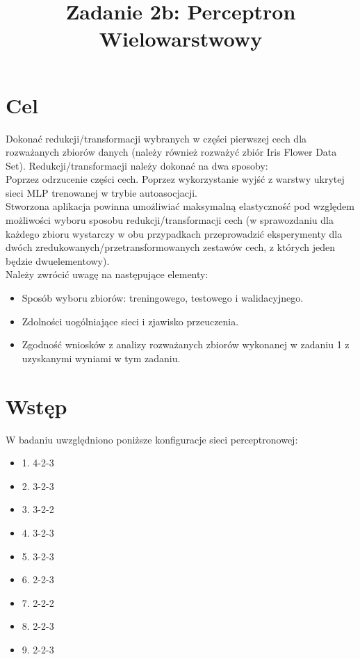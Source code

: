 \documentclass{classrep}
\author{
  \studentinfo{Łukasz Ochmański}{183566} \and
  \studentinfo{Przemysław Szwajkowski}{173524}
}
\title{Zadanie 2b: Perceptron Wielowarstwowy}
\begin{document}
\maketitle


\section{Cel}
Dokonać redukcji/transformacji wybranych w części pierwszej cech dla rozważanych zbiorów danych (należy również rozważyć zbiór Iris Flower Data Set). Redukcji/transformacji należy dokonać na dwa sposoby:
\\
    Poprzez odrzucenie części cech.
    Poprzez wykorzystanie wyjść z warstwy ukrytej sieci MLP trenowanej w trybie autoasocjacji.
\\
Stworzona aplikacja powinna umożliwiać maksymalną elastyczność pod względem możliwości wyboru sposobu redukcji/transformacji cech (w sprawozdaniu dla każdego zbioru wystarczy w obu przypadkach przeprowadzić eksperymenty dla dwóch zredukowanych/przetransformowanych zestawów cech, z których jeden będzie dwuelementowy).
\\
Należy zwrócić uwagę na następujące elementy:
\begin{itemize}
	\item Sposób wyboru zbiorów: treningowego, testowego i walidacyjnego.
  \item Zdolności uogólniające sieci i zjawisko przeuczenia.
  \item Zgodność wniosków z analizy rozważanych zbiorów wykonanej  w zadaniu 1 z uzyskanymi wyniami w tym zadaniu.
\end{itemize}

\section{Wstęp}
W badaniu uwzględniono poniższe konfiguracje sieci perceptronowej:
\begin{itemize}
\item
1. 4-2-3
\item
2. 3-2-3
\item
3. 3-2-2
\item
4. 3-2-3
\item
5. 3-2-3
\item
6. 2-2-3
\item
7. 2-2-2
\item
8. 2-2-3
\item
9. 2-2-3
\end{itemize}
\end{document}
